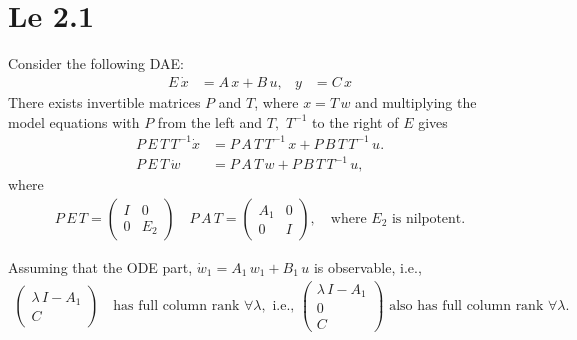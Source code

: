 \section{Le 2.1}

Consider the following DAE:
\begin{align*}
    E\,\dot x &= A\,x + B\,u, & y &= C\,x
\end{align*}
There exists invertible matrices $P$ and $T$, where $x = T\,w$ and multiplying the model equations with $P$ from the left and $T,$ $T^{-1}$ to the right of $E$ gives 
\begin{align*}
    P\,E\,T\,T^{-1}\dot x &= P\,A\,T\,T^{-1}\,x + P\,B\,T\,T^{-1}\,u. \\
    P\,E\,T\,\dot w &= P\,A\,T\,w + P\,B\,T\,T^{-1}\,u,
\end{align*}
where
\begin{align*}
    P\,E\,T = \begin{pmatrix}
        I & 0 \\ 0 & E_2 
    \end{pmatrix} \quad P\,A\,T = \begin{pmatrix}
        A_1 & 0 \\ 0 & I
    \end{pmatrix}, \quad \text{where $E_2$ is nilpotent.}
\end{align*}

Assuming that the ODE part, $\dot w_1 = A_1\,w_1 + B_1\,u$ is observable, i.e., 
\begin{align*}
    \begin{pmatrix}
        \lambda\,I - A_1 \\ C
    \end{pmatrix} \quad \text{has full column rank } \forall \lambda, \text{ i.e., } \begin{pmatrix}
        \lambda\,I - A_1 \\ 0 \\ C
    \end{pmatrix} \text{ also has full column rank } \forall \lambda.
\end{align*}

